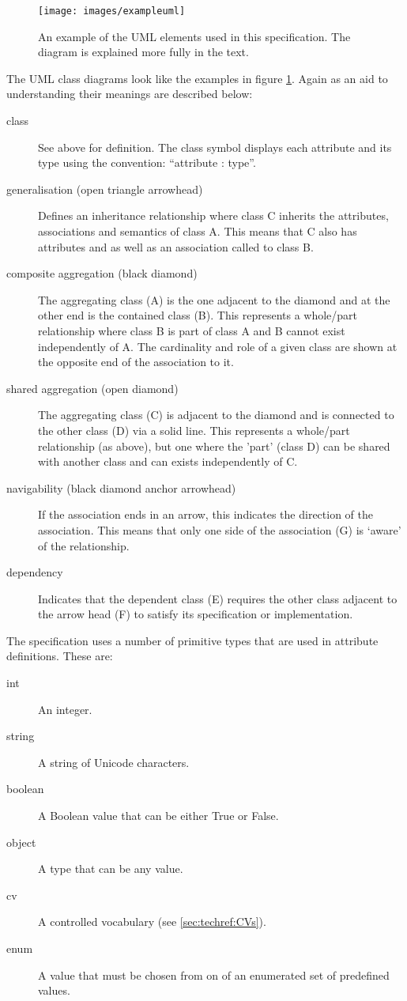 %
\begin{figure}[htb]
\begin{center}
\texttt{[image: images/exampleuml]}
\caption{An example of the UML elements used in this
  specification. The diagram is explained more fully in the text.}
\label{fig:techref:umlexample}
\end{center}
\end{figure}
%
The UML class diagrams look like the examples in
figure \ref{fig:techref:umlexample}. Again as an aid to
understanding their meanings are described below:
\begin{description}
\item[class] See above for definition. The class symbol displays each
  attribute and its type using the convention: ``attribute : type''.
\item[generalisation (open triangle arrowhead)] Defines an inheritance
  relationship where class C inherits the attributes, associations and
  semantics of class A. This means that C also has attributes
   and  as well as an association
called  to class B.
\item[composite aggregation (black diamond)] The aggregating class
  (A) is the one adjacent to the diamond and at the other end is the
  contained class (B). This represents a whole/part
  relationship where class B is part of class A and B cannot exist
  independently of A. The cardinality and role of a given class are
  shown at the opposite end of the association to it.
\item[shared aggregation (open diamond)] The aggregating class (C) is
  adjacent to the diamond and is connected to the other class (D) via
  a solid line. This represents a whole/part relationship (as above), but one
  where the 'part' (class D) can be shared with another class and can
  exists independently of C.
\item[navigability (black diamond anchor arrowhead)] If the
  association ends in an arrow, this indicates the direction of the
  association. This means that only one side of the association (G)
  is `aware' of the relationship.
\item[dependency] Indicates that the dependent class (E) requires the
  other class adjacent to the arrow head (F) to satisfy its
  specification or implementation.
\end{description}
%
The specification uses a number of primitive types that are used in
attribute definitions. These are:
\begin{description}
\item[int] An integer.
\item[string] A string of Unicode characters.
\item[boolean] A Boolean value that can be either True or False.
\item[object] A type that can be any value.
\item[cv] A controlled vocabulary (see \ref{sec:techref:CVs}).
\item[enum] A value that must be chosen from on of an enumerated set
  of predefined values.
\end{description}



